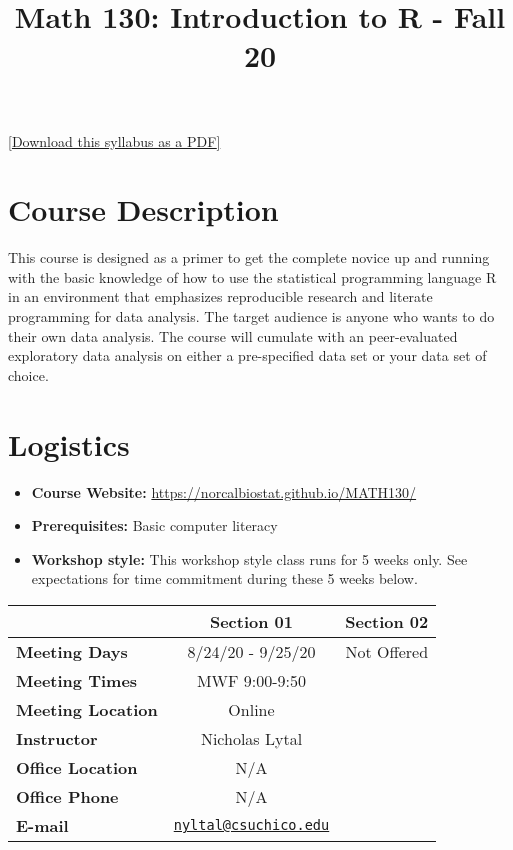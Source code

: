 \documentclass[
  11pt,
]{article}
\title{Math 130: Introduction to R - Fall 20}
\author{}
\date{\vspace{-2.5em}}
\providecommand{\tightlist}{%
  \setlength{\itemsep}{0pt}\setlength{\parskip}{0pt}}
\begin{document}
\maketitle

\href{syllabus.pdf}{{[}Download this syllabus as a PDF{]}}

\hypertarget{course-description}{%
\section{Course Description}\label{course-description}}

This course is designed as a primer to get the complete novice up and
running with the basic knowledge of how to use the statistical
programming language R in an environment that emphasizes reproducible
research and literate programming for data analysis. The target audience
is anyone who wants to do their own data analysis. The course will
cumulate with an peer-evaluated exploratory data analysis on either a
pre-specified data set or your data set of choice.

\hypertarget{logistics}{%
\section{Logistics}\label{logistics}}

\begin{itemize}
\tightlist
\item
  \textbf{Course Website:}
  \url{https://norcalbiostat.github.io/MATH130/}
\item
  \textbf{Prerequisites:} Basic computer literacy
\item
  \textbf{Workshop style:} This workshop style class runs for 5 weeks
  only. See expectations for time commitment during these 5 weeks below.
\end{itemize}

\begin{longtable}[]{@{}lcc@{}}
\toprule
& Section 01 & Section 02\tabularnewline
\midrule
\endhead
\textbf{Meeting Days} & 8/24/20 - 9/25/20 & Not Offered\tabularnewline
\textbf{Meeting Times} & MWF 9:00-9:50 &\tabularnewline
\textbf{Meeting Location} & Online &\tabularnewline
\textbf{Instructor} & Nicholas Lytal &\tabularnewline
\textbf{Office Location} & N/A &\tabularnewline
\textbf{Office Phone} & N/A &\tabularnewline
\textbf{E-mail} &
\href{mailto:nyltal@csuchico.edu}{\nolinkurl{nyltal@csuchico.edu}}
&\tabularnewline
\bottomrule
\end{longtable}
\end{document}
